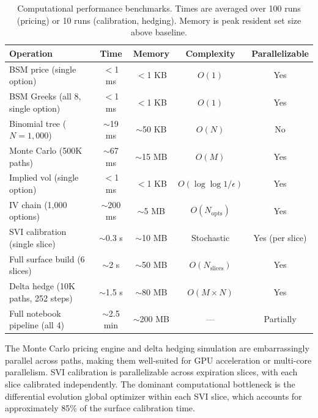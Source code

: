\documentclass[11pt,a4paper]{article}
\begin{document}
\begin{appendices}
\begin{table}[H]
    \centering
    \caption{Computational performance benchmarks. Times are averaged over 100 runs (pricing) or 10 runs (calibration, hedging). Memory is peak resident set size above baseline.}
    \label{tab:performance}
    \begin{tabularx}{\textwidth}{Xcccc}
        \toprule
        \textbf{Operation} & \textbf{Time} & \textbf{Memory} & \textbf{Complexity} & \textbf{Parallelizable} \\
        \midrule
        BSM price (single option) & $<$1 ms & $<$1 KB & $O(1)$ & Yes \\
        BSM Greeks (all 8, single option) & $<$1 ms & $<$1 KB & $O(1)$ & Yes \\
        Binomial tree ($N = 1{,}000$) & $\sim$19 ms & $\sim$50 KB & $O(N)$ & No \\
        Monte Carlo (500K paths) & $\sim$67 ms & $\sim$15 MB & $O(M)$ & Yes \\
        Implied vol (single option) & $<$1 ms & $<$1 KB & $O(\log \log 1/\epsilon)$ & Yes \\
        IV chain (1{,}000 options) & $\sim$200 ms & $\sim$5 MB & $O(N_{\text{opts}})$ & Yes \\
        SVI calibration (single slice) & $\sim$0.3 s & $\sim$10 MB & Stochastic & Yes (per slice) \\
        Full surface build (6 slices) & $\sim$2 s & $\sim$50 MB & $O(N_{\text{slices}})$ & Yes \\
        Delta hedge (10K paths, 252 steps) & $\sim$1.5 s & $\sim$80 MB & $O(M \times N)$ & Yes \\
        Full notebook pipeline (all 4) & $\sim$2.5 min & $\sim$200 MB & --- & Partially \\
        \bottomrule
    \end{tabularx}
\end{table}

The Monte Carlo pricing engine and delta hedging simulation are embarrassingly parallel across paths, making them well-suited for GPU acceleration or multi-core parallelism. SVI calibration is parallelizable across expiration slices, with each slice calibrated independently. The dominant computational bottleneck is the differential evolution global optimizer within each SVI slice, which accounts for approximately 85\% of the surface calibration time.

\end{appendices}
\end{document}
